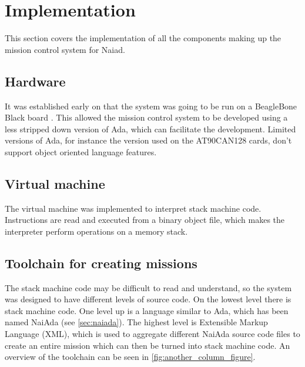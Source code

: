 \section{Implementation}\label{sec:implementation}
This section covers the implementation of all the components making up the mission control system for Naiad.
\subsection{Hardware}
It was established early on that the system was going to be run on a BeagleBone Black board \cite{web:mcsbbb}. This allowed the mission control system to be developed using a less stripped down version of Ada, which can facilitate the development. Limited versions of Ada, for instance the version used on the AT90CAN128 \cite{web:mcsatcan} cards, don't support object oriented language features.

\subsection{Virtual machine}
The virtual machine was implemented to interpret stack machine code. Instructions are read and executed from a binary object file, which makes the interpreter perform operations on
a memory stack.

\subsection{Toolchain for creating missions}
The stack machine code may be difficult to read and understand, so the system was designed to have different levels of source code. On the lowest level there is
stack machine code. One level up is a language similar to Ada, which has been named NaiAda (see \cref{sec:naiada}). The highest level is Extensible Markup Language (XML), which is used to aggregate different NaiAda source code files
to create an entire mission which can then be turned into stack machine code. An overview of the toolchain can be seen in \cref{fig:another_column_figure}.

